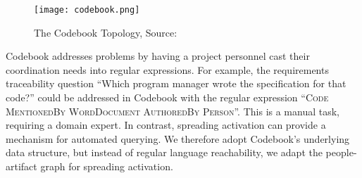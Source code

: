 \begin{figure}[ht!]
	\centering
	\texttt{[image: codebook.png]}
	\caption{The Codebook Topology, Source: ~\cite{codebook}}
	\label{fig:codebook}
\end{figure}

Codebook addresses problems by having a project personnel cast their coordination needs into regular expressions. For example, the requirements traceability question ``Which program manager wrote the specification for that code?'' could be addressed in Codebook with the regular expression ``\textsc{Code MentionedBy WordDocument AuthoredBy Person}''. This is a manual task, requiring a domain expert. In contrast, spreading activation can provide a mechanism for automated querying. We therefore adopt Codebook's underlying data structure, but instead of regular language reachability, we adapt the people-artifact graph for spreading activation.